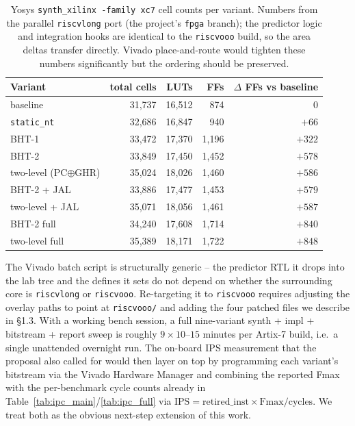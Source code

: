 \documentclass[10pt]{article}
\begin{document}
\begin{table}[h]
\centering
\caption{Yosys \texttt{synth\_xilinx -family xc7} cell counts per
variant. Numbers from the parallel \texttt{riscvlong} port (the
project's \texttt{fpga} branch); the predictor logic and integration
hooks are identical to the \texttt{riscvooo} build, so the area
deltas transfer directly. Vivado place-and-route would tighten these
numbers significantly but the ordering should be preserved.}
\label{tab:yosys}
\begin{tabular}{lrrrr}
\toprule
Variant & total cells & LUTs & FFs & $\Delta$ FFs vs baseline \\
\midrule
baseline       & 31{,}737 & 16{,}512 &   874 &      0 \\
\texttt{static\_nt}    & 32{,}686 & 16{,}847 &   940 &  $+66$ \\
BHT-1          & 33{,}472 & 17{,}370 & 1{,}196 & $+322$ \\
BHT-2          & 33{,}849 & 17{,}450 & 1{,}452 & $+578$ \\
two-level (PC$\oplus$GHR) & 35{,}024 & 18{,}026 & 1{,}460 & $+586$ \\
BHT-2 + JAL    & 33{,}886 & 17{,}477 & 1{,}453 & $+579$ \\
two-level + JAL & 35{,}071 & 18{,}056 & 1{,}461 & $+587$ \\
BHT-2 full     & 34{,}240 & 17{,}608 & 1{,}714 & $+840$ \\
two-level full  & 35{,}389 & 18{,}171 & 1{,}722 & $+848$ \\
\bottomrule
\end{tabular}
\end{table}

The Vivado batch script is structurally generic -- the predictor
RTL it drops into the lab tree and the defines it sets do not depend
on whether the surrounding core is \texttt{riscvlong} or
\texttt{riscvooo}. Re-targeting it to \texttt{riscvooo} requires
adjusting the overlay paths to point at \texttt{riscvooo/} and
adding the four patched files we describe in §1.3. With a working
bench session, a full nine-variant synth + impl + bitstream + report
sweep is roughly $9 \times 10\text{--}15$ minutes per Artix-7 build,
i.e.\ a single unattended overnight run. The on-board IPS measurement
that the proposal also called for would then layer on top by
programming each variant's bitstream via the Vivado Hardware Manager
and combining the reported Fmax with the per-benchmark cycle counts
already in Table~\ref{tab:ipc_main}/\ref{tab:ipc_full} via
$\text{IPS} = \text{retired\_inst} \times \text{Fmax} / \text{cycles}$.
We treat both as the obvious next-step extension of this work.
\end{document}
